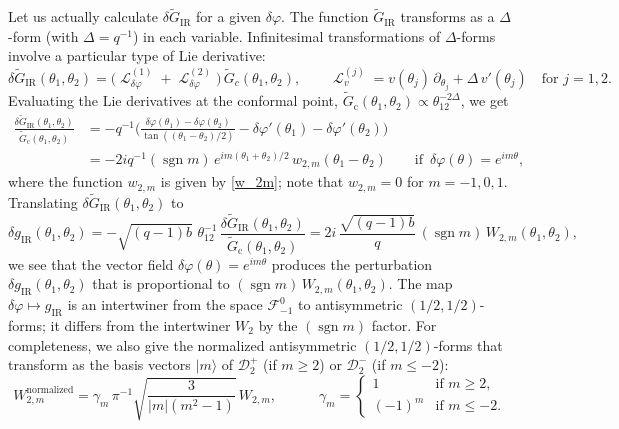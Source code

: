\documentclass[12pt]{article}
\newcommand*{\kett}[1]{|{#1}\rangle}
\renewcommand{\le}{\leqslant}
\renewcommand{\ge}{\geqslant}
\newcommand{\calD}{\mathcal{D}}
\newcommand{\calF}{\mathcal{F}}
\DeclareMathOperator{\sgn}{sgn}
\DeclareMathOperator{\Ld}{\mathcal{L}}
\newcommand{\cc}{\mathrm{c}}
\newcommand{\IR}{\text{IR}}
\newcommand{\tG}{\widetilde{G}}
\newcommand{\de}{\delta}
\newcommand{\vp}{\varphi}
\begin{document}
Let us actually calculate $\delta\tG_{\IR}$ for a given $\delta\vp$. The function $\tG_{\IR}$ transforms as a $\Delta$-form (with $\Delta=q^{-1}$) in each variable. Infinitesimal transformations of $\Delta$-forms involve a particular type of Lie derivative:
\begin{equation} \label{LieDdef}
\delta\tG_{\IR}(\theta_1,\theta_2)
=\bigl(\Ld_{\delta\vp}^{(1)}
+\Ld_{\delta\vp}^{(2)}\bigr)\,\tG_{c}(\theta_1,\theta_2),\qquad
\Ld_{v}^{(j)}=v(\theta_j)\,\partial_{\theta_j}+\Delta\, v'(\theta_j)\quad
\text{for } j=1,2.
\end{equation}
Evaluating the Lie derivatives at the conformal point, $\tG_{\cc}(\theta_1,\theta_2) \propto\theta_{12}^{-2\Delta}$, we get
\begin{align}
\frac{\delta\tG_{\IR}(\theta_1,\theta_2)}{\tG_{\cc}(\theta_1,\theta_2)}
&=-q^{-1}
\biggl(\frac{\delta\vp(\theta_1)-\delta\vp(\theta_2)}
{\tan((\theta_1-\theta_2)/2)}
-\delta\vp'(\theta_1)-\delta\vp'(\theta_2)\biggr)
\\[5pt]
\label{deltaG_w2}
&=-2iq^{-1}(\sgn m)\,e^{im(\theta_1+\theta_2)/2}\,w_{2,m}(\theta_1-\theta_2)
\qquad \text{if }\, \delta\vp(\theta)=e^{im\theta},
\end{align}
where the function $w_{2,m}$ is given by \eqref{w_2m}; note that $w_{2,m}=0$ for $m=-1,0,1$. Translating $\delta\tG_{\IR}(\theta_1,\theta_2)$ to
\begin{equation}\label{dg_W2}
\de g_{\IR}(\theta_1,\theta_2)
=-\sqrt{(q-1)b}\,\, \theta_{12}^{-1}\,
\frac{\delta\tG_{\IR}(\theta_1,\theta_2)}{\tG_{\cc}(\theta_1,\theta_2)}
=2i\,\frac{\sqrt{(q-1)b}}{q}\,(\sgn m)\,W_{2,m}(\theta_1,\theta_2),
\end{equation}
we see that the vector field $\delta\vp(\theta)=e^{im\theta}$ produces the perturbation $\de g_{\IR}(\theta_1,\theta_2)$ that is proportional to $(\sgn m)\,W_{2,m}(\theta_1,\theta_2)$. The map $\delta\vp\mapsto g_{\IR}$ is an intertwiner from the space $\calF^0_{-1}$ to antisymmetric $(1/2,1/2)$-forms; it differs from the intertwiner $W_{2}$ by the $(\sgn m)$ factor. For completeness, we also give the normalized antisymmetric $(1/2,1/2)$-forms that transform as the basis vectors $\kett{m}$ of $\calD^{+}_{2}$ (if $m\ge 2$) or $\calD^{-}_{2}$ (if $m\le -2$):
\begin{equation}
W_{2,m}^{\text{normalized}}
=\gamma_m\,\pi^{-1}\sqrt{\frac{3}{|m|(m^2-1)}}\,W_{2,m},\qquad\quad
\gamma_m=\begin{cases}
1 &\text{if }m\ge 2,\\
(-1)^m &\text{if }m\le -2.
\end{cases}
\end{equation}
\end{document}
